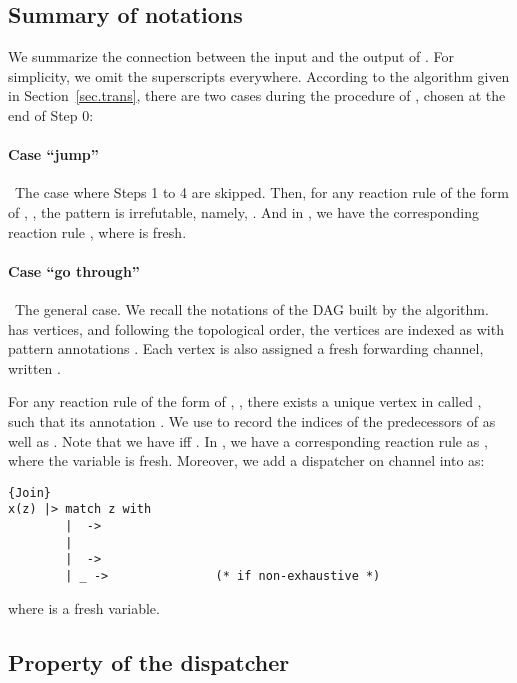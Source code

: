 \documentclass{LMCS}
\renewcommand{\_}{\mathord{\rule[-.25ex]{1ex}{.15ex}}}
\begin{document}
\subsection{Summary of notations}
\label{subsec.Yx}

We summarize the connection between the input and the output of .
For simplicity, we omit the  superscripts everywhere.
According to the algorithm given in Section~\ref{sec.trans},
there are two cases during the procedure of , chosen at the end
of Step 0:
\paragraph{\bf Case ``jump''}\ The case where Steps 1 to 4 are skipped. Then,
  for any reaction rule of the form 
  of , , the pattern  is irrefutable, namely,
  . And in , we have the corresponding
  reaction rule
  , where 
  is fresh.
\paragraph{\bf Case ``go through''}\ The general case. We recall the notations
  of the DAG  built by the algorithm.  has  vertices,
  and following the topological order, the vertices are indexed as
   with pattern annotations .  Each vertex is
  also assigned a fresh forwarding channel, written .
  
  For any reaction rule of the form
   of , , there
  exists a unique vertex in  called , such that its
  annotation . We use 
  to record the indices of the predecessors of  as well as
  . Note that we have  iff
  . In , we have a corresponding reaction
  rule as , where the variable  is fresh.
  Moreover, we add a dispatcher on channel  into  as:
\begin{lstlisting}{Join}
x(z) |> match z with
        |  -> 
        | 
        |  -> 
        | _ ->               (* if non-exhaustive *) 
\end{lstlisting}
where  is a fresh variable.


\subsection{Property of the dispatcher}
\label{subsec.dispatcher}
\end{document}
